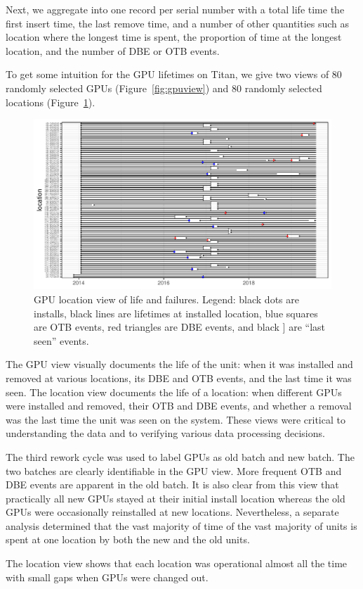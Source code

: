 Next, we aggregate into one record per serial number with a total life
time the first insert time, the last remove time, and a number of
other quantities such as location where the longest time is spent, the
proportion of time at the longest location, and the number of DBE or
OTB events.

To get some intuition for the GPU lifetimes on Titan, we give two
views of 80 randomly selected GPUs (Figure~\ref{fig:gpuview}) and 80
randomly selected locations (Figure~\ref{fig:locview}).
\begin{figure}[tb]
  \includegraphics[width=6.5in]{figs/sample_loc.pdf}
  \caption{GPU location view of life and failures.  Legend: black
    dots are installs, black lines are lifetimes at installed
    location, blue squares are OTB events, red triangles are DBE
    events, and black ] are ``last seen'' events.}
  \label{fig:locview}
\end{figure}
The GPU view
visually documents the life of the unit: when it was installed and
removed at various locations, its DBE and OTB events, and the last
time it was seen. The location view documents the life of a location:
when different GPUs were installed and removed, their OTB and DBE
events, and whether a removal was the last time the unit was seen on
the system. These views were critical to understanding the data and to
verifying various data processing decisions.

The third rework cycle was used to label GPUs as old batch and new
batch. The two batches are clearly identifiable in the GPU view. More
frequent OTB and DBE events are apparent in the old batch. It is also
clear from this view that practically all new GPUs stayed at their
initial install location whereas the old GPUs were occasionally
reinstalled at new locations. Nevertheless, a separate analysis
determined that the vast majority of time of the vast majority of
units is spent at one location by both the new and the old units.

The location view shows that each location was operational almost all
the time with small gaps when GPUs were changed out.

